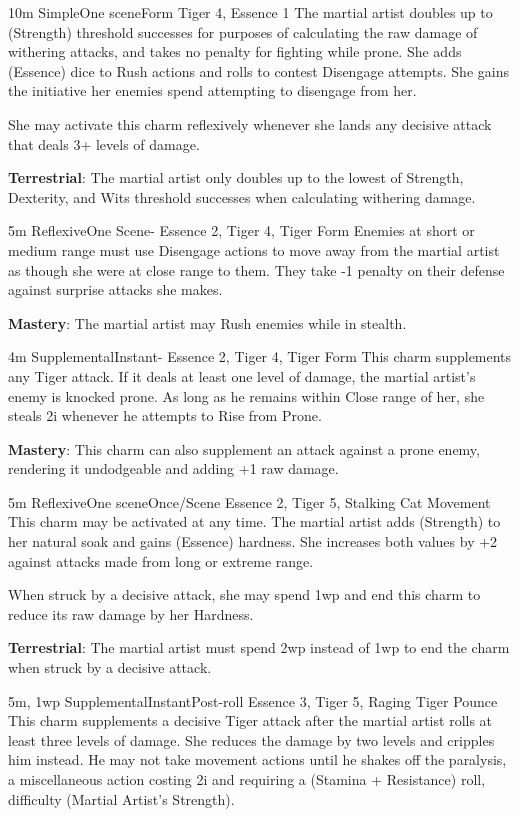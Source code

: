 
{10m}
{Simple}{One scene}{Form}
{Tiger 4, Essence 1}
The martial artist doubles up to (Strength) threshold successes for purposes of calculating the raw damage of withering attacks, and takes no penalty for fighting while prone. She adds (Essence) dice to Rush actions and rolls to contest Disengage attempts. She gains the initiative her enemies spend attempting to disengage from her.

She may activate this charm reflexively whenever she lands any decisive attack that deals 3+ levels of damage.

\textbf{Terrestrial}: The martial artist only doubles up to the lowest of Strength, Dexterity, and Wits threshold successes when calculating withering damage.

{5m}
{Reflexive}{One Scene}{-}
{Essence 2, Tiger 4, Tiger Form}
Enemies at short or medium range must use Disengage actions to move away from the martial artist as though she were at close range to them. They take -1 penalty on their defense against surprise attacks she makes.

\textbf{Mastery}: The martial artist may Rush enemies while in stealth.

{4m}
{Supplemental}{Instant}{-}
{Essence 2, Tiger 4, Tiger Form}
This charm supplements any Tiger attack. If it deals at least one level of damage, the martial artist's enemy is knocked prone. As long as he remains within Close range of her, she steals 2i whenever he attempts to Rise from Prone.

\textbf{Mastery}: This charm can also supplement an attack against a prone enemy, rendering it undodgeable and adding +1 raw damage.

{5m}
{Reflexive}{One scene}{Once/Scene}
{Essence 2, Tiger 5, Stalking Cat Movement}
This charm may be activated at any time. The martial artist adds (Strength) to her natural soak and gains (Essence) hardness. She increases both values by +2 against attacks made from long or extreme range.

When struck by a decisive attack, she may spend 1wp and end this charm to reduce its raw damage by her Hardness.

\textbf{Terrestrial}: The martial artist must spend 2wp instead of 1wp to end the charm when struck by a decisive attack.

{5m, 1wp}
{Supplemental}{Instant}{Post-roll}
{Essence 3, Tiger 5, Raging Tiger Pounce}
This charm supplements a decisive Tiger attack after the martial artist rolls at least three levels of damage. She reduces the damage by two levels and cripples him instead. He may not take movement actions until he shakes off the paralysis, a miscellaneous action costing 2i and requiring a (Stamina + Resistance) roll, difficulty (Martial Artist's Strength).


